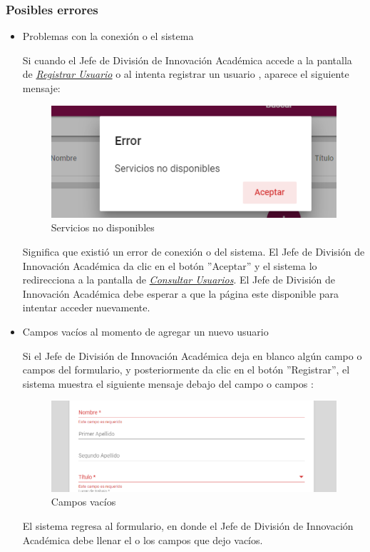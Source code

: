 \subsubsection{Posibles errores}

\begin{itemize}
	\item Problemas con la conexión o el sistema
	
	Si cuando el Jefe de División de Innovación Académica  accede a la pantalla de \hyperlink{registrarUs}{\textit{Registrar Usuario}} o al intenta registrar un usuario , aparece el siguiente mensaje:
	
	\begin{figure}[H]
		\centering
		\includegraphics[width=0.4\linewidth]{images/SP5/MSGSN}
		\caption{Servicios no disponibles}
		\label{SND}
		
	\end{figure}
	
	Significa que existió un error de conexión o del sistema. El Jefe de División de Innovación Académica  da clic en el botón ''Aceptar'' y el sistema lo redirecciona  a la pantalla de \hyperlink{consultarUs}{\textit{Consultar Usuarios}}. El Jefe de División de Innovación Académica  debe esperar a que la página este disponible para intentar acceder nuevamente.
	
	\item Campos vacíos al momento de agregar un nuevo usuario
	
	Si el Jefe de División de Innovación Académica  deja en blanco algún campo o campos del formulario, y posteriormente da clic en el botón ''Registrar'', el sistema muestra el siguiente mensaje debajo del campo o campos :
	
	\begin{figure}[H]
		\centering
		\includegraphics[width=0.4\linewidth]{images/SP5/MSG44}
		\caption{Campos vacíos}
		\label{mensaje44}
	\end{figure}
	
	El sistema regresa al formulario, en donde el Jefe de División de Innovación Académica  debe llenar el o los campos que dejo vacíos.
	

\end{itemize}
